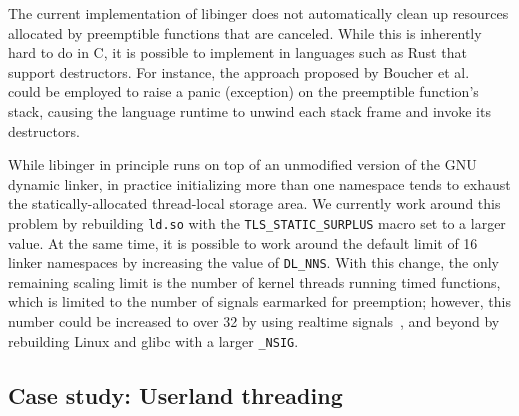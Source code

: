 The current implementation of libinger does not automatically clean up resources
allocated by preemptible functions that are canceled.  While this is inherently hard
to do in C, it is possible to implement in languages such as Rust that support
destructors.  For instance, the approach proposed by Boucher et
al.~\cite{boucher:atc2018} could be employed to raise a panic (exception) on the
preemptible function's stack, causing the language runtime to unwind each stack frame
and invoke its destructors.

While libinger in principle runs on top of an unmodified version of the GNU dynamic
linker, in practice initializing more than one namespace tends to exhaust the
statically-allocated thread-local storage area.  We currently work around this
problem by rebuilding \texttt{ld.so} with the \texttt{TLS\_STATIC\_SURPLUS} macro set
to a larger value.  At the same time, it is possible to work around the default limit
of 16 linker namespaces by increasing the value of \texttt{DL\_NNS}.  With this
change, the only remaining scaling limit is the number of kernel threads running
timed functions, which is limited to the number of signals earmarked for preemption;
however, this number could be increased to over 32 by using realtime
signals~\cite{signal-manpage}, and beyond by rebuilding Linux and glibc with a larger
\texttt{\_NSIG}.



\subsection{Case study: Userland threading}
\label{sec:threading}
